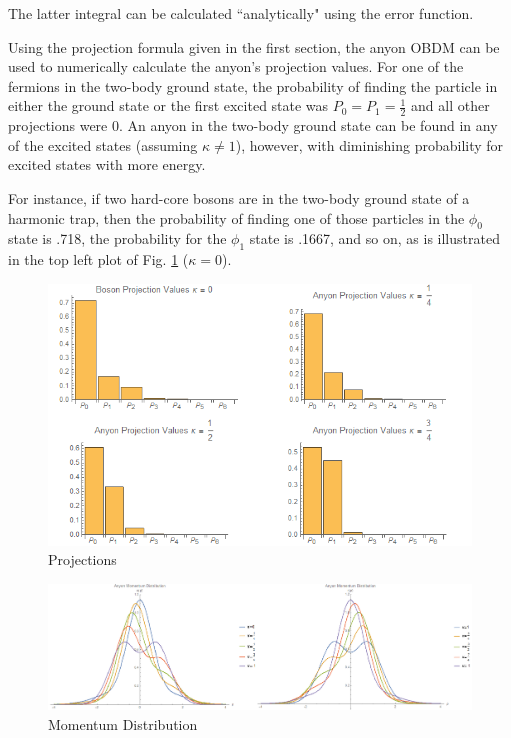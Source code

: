 \documentclass[onecolumn,english,aps,pra]{revtex4}
\begin{document}
The latter integral can be calculated ``analytically" using the error function. 

Using the projection formula given in the first section, the anyon OBDM can be used to numerically calculate the anyon's projection values. For one of the fermions in the two-body ground state, the probability of finding the particle in either the ground state or the first excited state was $P_{0} = P_{1} = \frac{1}{2}$ and all other projections were 0. An anyon in the two-body ground state can be found in any of the excited states (assuming $\kappa \neq 1$), however, with diminishing probability for excited states with more energy. 

For instance, if two hard-core bosons are in the two-body ground state of a harmonic trap, then the probability of finding one of those particles in the $\phi_0$ state is .718, the probability for the $\phi_1$ state is .1667, and so on, as is illustrated in the top left plot of Fig. \ref{fig:projections} ($\kappa = 0$).
\begin{figure}[h]
	\includegraphics[scale=.5]{"../Plots/Anyon Projection Values"}
	\caption{Projections}
	\label{fig:projections}
\end{figure}
\begin{figure}[h]
\includegraphics[scale=.5]{"../Plots/Momentum"}
\caption{Momentum Distribution}
\label{fig:momentum}
\end{figure}
\end{document}
